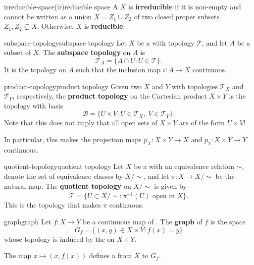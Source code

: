 \begin{topic}{irreducible-space}{(ir)reducible space}
    A  $X$ is \textbf{irreducible} if it is non-empty and cannot be written as a union $X = Z_1 \cup Z_2$ of two closed proper subsets $Z_1, Z_2 \subsetneq X$. Otherwise, $X$ is \textbf{reducible}.
\end{topic}

\begin{topic}{subspace-topology}{subspace topology}
    Let $X$ be a  with topology $\mathcal{T}$, and let $A$ be a subset of $X$. The \textbf{subspace topology} on $A$ is
    \[ \mathcal{T}_A = \{ A \cap U : U \in \mathcal{T} \} . \]
    It is the  topology on $A$ such that the inclusion map $i \colon A \to X$ continuous.
\end{topic}

\begin{topic}{product-topology}{product topology}
    Given two  $X$ and $Y$ with topologies $\mathcal{T}_X$ and $\mathcal{T}_Y$, respectively, the \textbf{product topology} on the Cartesian product $X \times Y$ is the topology with basis
    \[ \mathcal{B} = \{ U \times V : U \in \mathcal{T}_X, \; V \in \mathcal{T}_Y \} . \]
    Note that this does not imply that all open sets of $X \times Y$ are of the form $U \times V$!
    
    In particular, this makes the projection maps $p_X \colon X \times Y \to X$ and $p_Y \colon X \times Y \to Y$ continuous.
\end{topic}

\begin{topic}{quotient-topology}{quotient topology}
    Let $X$ be a  with an equivalence relation $\sim{}$, denote the set of equivalence classes by $X / \sim{}$, and let $\pi \colon X \to X / \sim{}$ be the natural map. The \textbf{quotient topology} on $X / \sim{}$ is given by
    \[ \tilde{\mathcal{T}} = \{ U \subset X / \sim{} : \pi^{-1}(U) \text{ open in } X \} . \]
    This is the  topology that makes $\pi$ continuous.
\end{topic}

\begin{topic}{graph}{graph}
    Let $f \colon X \to Y$ be a continuous map of . The \textbf{graph} of $f$ is the space
    \[ G_f = \{ (x, y) \in X \times Y : f(x) = y \} \]
    whose topology is induced by the  on $X \times Y$.
    
    The map $x \mapsto (x, f(x))$ defines a  from $X$ to $G_f$.
\end{topic}

